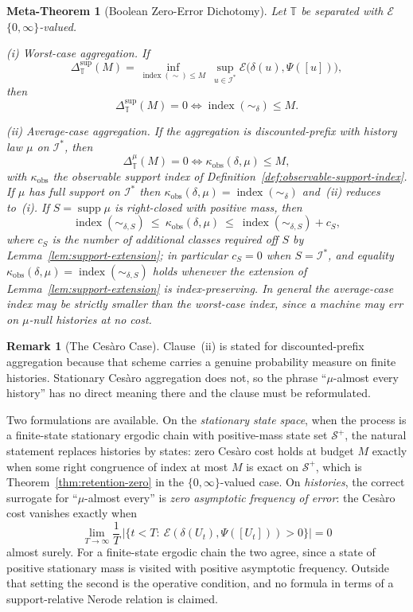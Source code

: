 \documentclass[12pt]{article}
\newtheorem{metatheorem}[theorem]{Meta-Theorem}
\theoremstyle{definition}
\newtheorem{remark}[theorem]{Remark}
\newcommand{\Splus}{\mathcal S^{+}}
\begin{document}
\begin{metatheorem}[Boolean Zero-Error Dichotomy]
\label{meta:boolean}
Let $\mathbb T$ be separated with $\mathcal E$ $\{0,\infty\}$-valued.

\emph{(i) Worst-case aggregation.}  If
\[
\Delta_{\mathbb T}^{\sup}(M)
=
\inf_{\operatorname{index}(\sim)\le M}
\ \sup_{u\in\mathcal I^*}
\mathcal E\bigl(\delta(u),\Psi([u])\bigr),
\]
then
\[
\Delta_{\mathbb T}^{\sup}(M)=0
\iff
\operatorname{index}(\sim_\delta)\le M.
\]

\emph{(ii) Average-case aggregation.}  If the aggregation is discounted-prefix
with history law $\mu$ on $\mathcal I^*$, then
\[
\Delta_{\mathbb T}^{\mu}(M)=0
\iff
\kappa_{\mathrm{obs}}(\delta,\mu)\le M,
\]
with $\kappa_{\mathrm{obs}}$ the observable support index of
Definition~\ref{def:observable-support-index}.  If $\mu$ has full support on
$\mathcal I^*$ then
$\kappa_{\mathrm{obs}}(\delta,\mu)=\operatorname{index}(\sim_\delta)$ and~(ii)
reduces to~(i).  If $S=\operatorname{supp}\mu$ is right-closed with positive
mass, then
\[
\operatorname{index}(\sim_{\delta,S})
\ \le\
\kappa_{\mathrm{obs}}(\delta,\mu)
\ \le\
\operatorname{index}(\sim_{\delta,S})+c_S,
\]
where $c_S$ is the number of additional classes required off $S$ by
Lemma~\ref{lem:support-extension}; in particular $c_S=0$ when
$S=\mathcal I^*$, and equality
$\kappa_{\mathrm{obs}}(\delta,\mu)=\operatorname{index}(\sim_{\delta,S})$ holds
whenever the extension of Lemma~\ref{lem:support-extension} is
index-preserving.
In general the average-case index may be strictly smaller than the worst-case
index, since a machine may err on $\mu$-null histories at no cost.
\end{metatheorem}

\begin{remark}[The Ces\`aro Case]
\label{rem:cesaro-boolean}
Clause~(ii) is stated for discounted-prefix aggregation because that scheme
carries a genuine probability measure on finite histories.  Stationary
Ces\`aro aggregation does not, so the phrase ``$\mu$-almost every history'' has
no direct meaning there and the clause must be reformulated.

Two formulations are available.  On the \emph{stationary state space}, when
the process is a finite-state stationary ergodic chain with positive-mass
state set $\Splus$, the natural statement replaces histories by states: zero
Ces\`aro cost holds at budget $M$ exactly when some right congruence of index
at most $M$ is exact on $\Splus$, which is
Theorem~\ref{thm:retention-zero} in the $\{0,\infty\}$-valued case.  On
\emph{histories}, the correct surrogate for ``$\mu$-almost every'' is
\emph{zero asymptotic frequency of error}: the Ces\`aro cost vanishes exactly
when
\[
\lim_{T\to\infty}\frac1T\,\bigl|\{t<T:\ \mathcal E(\delta(U_t),\Psi([U_t]))>0\}\bigr|
=0
\]
almost surely.  For a finite-state ergodic chain the two agree, since a state
of positive stationary mass is visited with positive asymptotic frequency.
Outside that setting the second is the operative condition, and no formula in
terms of a support-relative Nerode relation is claimed.
\end{remark}
\end{document}
